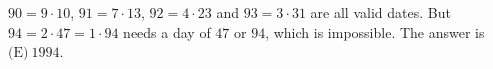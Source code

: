 $90=9\cdot10$, $91=7\cdot13$, $92=4\cdot23$ and $93=3\cdot31$ are all valid dates. But $94=2\cdot47=1\cdot94$ needs a day of $47$ or $94$, which is impossible. The answer is $\boxed{\text{(E)}\ 1994}$.
